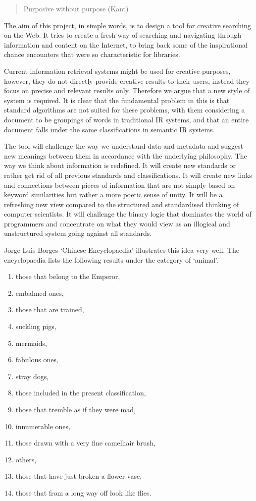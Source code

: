 \begin{quote}
  Purposive without purpose (Kant)
\end{quote}

The aim of this project, in simple words, is to design a tool for creative searching on the Web. It tries to create a fresh way of searching and navigating through information and content on the Internet, to bring back some of the inspirational chance encounters that were so characteristic for libraries.

Current information retrieval systems might be used for creative purposes, however, they do not directly provide creative results to their users, instead they focus on precise and relevant results only. Therefore we argue that a new style of system is required. It is clear that the fundamental problem in this is that standard algorithms are not suited for these problems, with them considering a document to be groupings of words in traditional IR systems, and that an entire document falls under the same classifications in semantic IR systems.

The tool will challenge the way we understand data and metadata and suggest new meanings between them in accordance with the underlying philosophy. The way we think about information is redefined. It will create new standards or rather get rid of all previous standards and classifications. It will create new links and connections between pieces of information that are not simply based on keyword similarities but rather a more poetic sense of unity. It will be a refreshing new view compared to the structured and standardised thinking of computer scientists. It will challenge the binary logic that dominates the world of programmers and concentrate on what they would view as an illogical and unstructured system going against all standards.

Jorge Luis Borges `Chinese Encyclopaedia' \autocite{Borges2000} illustrates this idea very well. The encyclopaedia lists the following results under the category of `animal'.

\begin{enumerate}
  \item those that belong to the Emperor,
  \item embalmed ones,
  \item those that are trained,
  \item suckling pigs,
  \item mermaids,
  \item fabulous ones,
  \item stray dogs,
  \item those included in the present classification,
  \item those that tremble as if they were mad,
  \item innumerable ones,
  \item those drawn with a very fine camelhair brush,
  \item others,
  \item those that have just broken a flower vase,
  \item those that from a long way off look like flies.
\end{enumerate}

